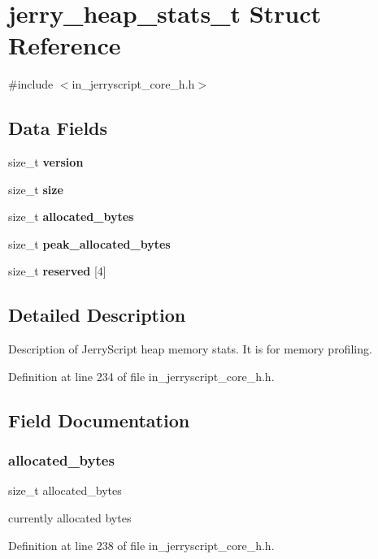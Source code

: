 \section{jerry\+\_\+heap\+\_\+stats\+\_\+t Struct Reference}
\label{structjerry__heap__stats__t}


{\ttfamily \#include $<$in\+\_\+jerryscript\+\_\+core\+\_\+h.\+h$>$}

\subsection*{Data Fields}
\begin{DoxyCompactItemize}
\item 
size\+\_\+t \textbf{ version}
\item 
size\+\_\+t \textbf{ size}
\item 
size\+\_\+t \textbf{ allocated\+\_\+bytes}
\item 
size\+\_\+t \textbf{ peak\+\_\+allocated\+\_\+bytes}
\item 
size\+\_\+t \textbf{ reserved} [4]
\end{DoxyCompactItemize}


\subsection{Detailed Description}
Description of Jerry\+Script heap memory stats. It is for memory profiling. 

Definition at line 234 of file in\+\_\+jerryscript\+\_\+core\+\_\+h.\+h.



\subsection{Field Documentation}
\mbox{\label{structjerry__heap__stats__t_a95968f576c7fc090faa4d47ce41e3fa9}} 
\subsubsection{allocated\_bytes}
{\footnotesize\ttfamily size\+\_\+t allocated\+\_\+bytes}

currently allocated bytes 

Definition at line 238 of file in\+\_\+jerryscript\+\_\+core\+\_\+h.\+h.


